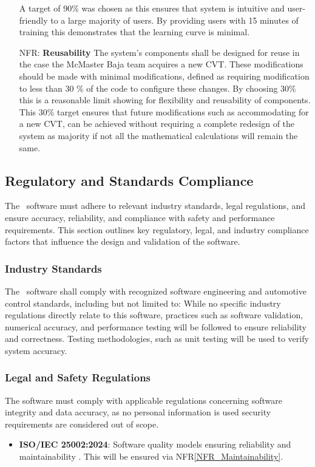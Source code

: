 \documentclass[12pt]{article}
\newcounter{nfrnum} %
\begin{document}
\begin{itemize}
A target of 90\% was chosen as this ensures that system is intuitive and user-friendly to a large majority of users. 
By providing users with 15 minutes of training this demonstrates that the learning curve is minimal. 
\item[NFR\refstepcounter{nfrnum}\thenfrnum \label{NFR_Reusability}:] \textbf{Reusability} The system's components shall be designed for reuse in the case the McMaster Baja team acquires a new CVT. 
These modifications should be made with minimal modifications, defined as requiring modification to less than 30 \% of the code to configure these changes.
By choosing 30\% this is a reasonable limit showing for flexibility and reusability of components. 
This 30\% target ensures that future modifications such as accommodating for a new CVT, can be achieved without requiring a complete redesign of the system as majority if not all the mathematical calculations will remain the same.

\end{itemize}

\subsection{Regulatory and Standards Compliance}
The \progname \ software must adhere to relevant industry standards, legal regulations, and ensure accuracy, reliability, and compliance with safety and performance requirements. 
This section outlines key regulatory, legal, and industry compliance factors that influence the design and validation of the software.

\subsubsection{Industry Standards}
The \progname \ software shall comply with recognized software engineering and automotive control standards, including but not limited to:
While no specific industry regulations directly relate to this software, practices such as software validation, numerical accuracy, and performance testing will be followed to ensure reliability and correctness. 
Testing methodologies, such as unit testing will be used to verify system accuracy.

\subsubsection{Legal and Safety Regulations}
The software must comply with applicable regulations concerning software integrity and data accuracy, as no personal information is used security requirements are considered out of scope.
\begin{itemize}
    \item \textbf{ISO/IEC 25002:2024}: Software quality models ensuring reliability and maintainability \cite{ISO26262Standard}. This will be ensured via NFR\ref{NFR_Maintainability}. 
\end{itemize}
\end{document}
